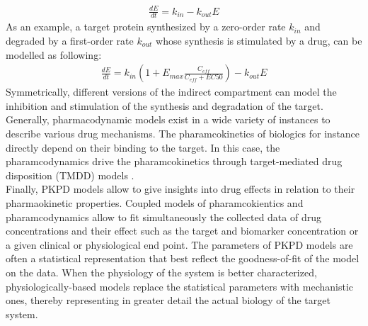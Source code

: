 \begin{equation}
\begin{gathered}
\frac{dE}{dt}=k_{in}-k_{out}E
\end{gathered}
\end{equation}
As an example, a target protein synthesized by a zero-order rate $k_{in}$ and degraded by a first-order rate $k_{out}$ whose synthesis is stimulated by a drug, can be modelled as following:
\begin{equation} 
\begin{gathered}
\frac{dE}{dt}=k_{in}(1+E_{max}\frac{C_{eff}}{C_{eff}+EC50})-k_{out}E
\end{gathered}
\end{equation}
Symmetrically, different versions of the indirect compartment can model the inhibition and stimulation of the synthesis and degradation of the target. Generally, pharmacodynamic models exist in a wide variety of instances to describe various drug mechanisms. The pharamcokinetics of biologics for instance directly depend on their binding to the target. In this case, the pharamcodynamics drive the pharamcokinetics through target-mediated drug disposition (TMDD) models \cite{dua2015tutorial}.\\
Finally, PKPD models allow to give insights into drug effects in relation to their pharmaokinetic properties. Coupled models of pharamcokientics and pharamcodynamics allow to fit simultaneously the collected data of drug concentrations and their effect such as the target and biomarker concentration or a given clinical or physiological end point. The parameters of PKPD models are often a statistical representation that best reflect the goodness-of-fit of the model on the data. When the physiology of the system is better characterized, physiologically-based models replace the statistical parameters with mechanistic ones, thereby representing in greater detail the actual biology of the target system.
